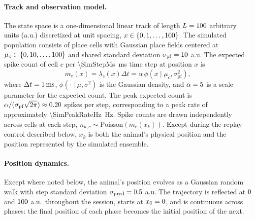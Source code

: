 \documentclass[12pt]{article}
\begin{document}
\paragraph{Track and observation model.}
The state space is a one-dimensional linear track of length $L = 100$ arbitrary units (a.u.) discretized at unit spacing, $x \in \{0, 1, \ldots, 100\}$. The simulated population consists of \SimNPlaceCellsWord{} place cells with Gaussian place fields centered at $\mu_c \in \{0, 10, \ldots, 100\}$ and shared standard deviation $\sigma_{\mathrm{pf}} = 10$ a.u. The expected spike count of cell $c$ per \SI{\SimStepMs}{ms} time step at position $x$ is
\begin{equation}
    \label{eq:rate}
    m_c(x) = \lambda_c(x)\Delta t = \alpha\, \phi\!\left(x \mid \mu_c, \sigma_{\mathrm{pf}}^{2}\right),
\end{equation}
where $\Delta t=\SI{1}{ms}$, $\phi(\cdot \mid \mu, \sigma^{2})$ is the Gaussian density, and $\alpha = 5$ is a scale parameter for the expected count. The peak expected count is $\alpha / (\sigma_{\mathrm{pf}}\sqrt{2\pi}) \approx 0.20$ spikes per step, corresponding to a peak rate of approximately \SI{\SimPeakRateHz}{Hz}. Spike counts are drawn independently across cells at each step, $n_{k,c} \sim \mathrm{Poisson}\!\left(m_c(x_k)\right)$. Except during the replay control described below, $x_k$ is both the animal's physical position and the position represented by the simulated ensemble.

\paragraph{Position dynamics.}
Except where noted below, the animal's position evolves as a Gaussian random walk with step standard deviation $\sigma_{\mathrm{pred}} = 0.5$ a.u. The trajectory is reflected at $0$ and $100$ a.u.\ throughout the session, starts at $x_0 = 0$, and is continuous across phases: the final position of each phase becomes the initial position of the next.
\end{document}
